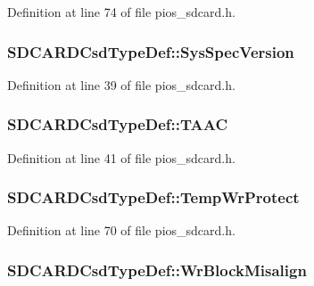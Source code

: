 Definition at line 74 of file pios\-\_\-sdcard.\-h.

\hypertarget{group___p_i_o_s___s_d_c_a_r_d_ga68ba16a5f115dc00b88d70d6912a1c45}{
\subsubsection[{Sys\-Spec\-Version}]{ S\-D\-C\-A\-R\-D\-Csd\-Type\-Def\-::\-Sys\-Spec\-Version}}\label{group___p_i_o_s___s_d_c_a_r_d_ga68ba16a5f115dc00b88d70d6912a1c45}


Definition at line 39 of file pios\-\_\-sdcard.\-h.

\hypertarget{group___p_i_o_s___s_d_c_a_r_d_gaec29af38b2fc16f147533e11c61e2787}{
\subsubsection[{T\-A\-A\-C}]{ S\-D\-C\-A\-R\-D\-Csd\-Type\-Def\-::\-T\-A\-A\-C}}\label{group___p_i_o_s___s_d_c_a_r_d_gaec29af38b2fc16f147533e11c61e2787}


Definition at line 41 of file pios\-\_\-sdcard.\-h.

\hypertarget{group___p_i_o_s___s_d_c_a_r_d_ga3a9535629b4573d3dbe39dabd51b341a}{
\subsubsection[{Temp\-Wr\-Protect}]{ S\-D\-C\-A\-R\-D\-Csd\-Type\-Def\-::\-Temp\-Wr\-Protect}}\label{group___p_i_o_s___s_d_c_a_r_d_ga3a9535629b4573d3dbe39dabd51b341a}


Definition at line 70 of file pios\-\_\-sdcard.\-h.

\hypertarget{group___p_i_o_s___s_d_c_a_r_d_gac79fcdd1037496c353ac1570fb9a58a5}{
\subsubsection[{Wr\-Block\-Misalign}]{ S\-D\-C\-A\-R\-D\-Csd\-Type\-Def\-::\-Wr\-Block\-Misalign}}\label{group___p_i_o_s___s_d_c_a_r_d_gac79fcdd1037496c353ac1570fb9a58a5}


